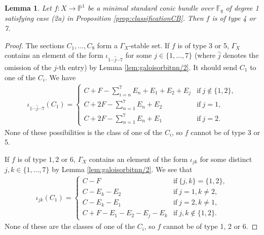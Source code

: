\documentclass[a4paper, 11pt, reqno]{amsart}
\numberwithin{equation}{section} \numberwithin{figure}{section}
\def \F {{\mathbb F}}
\def \P {{\mathbb P}}
\newcommand{\ra}{\rightarrow}
\newtheorem{lemma}{Lemma}
\theoremstyle{definition}
\numberwithin{lemma}{section}
\begin{document}
\begin{lemma}\label{lem:type4type7}
    Let $f \colon X \ra \P^1 $ be a minimal standard conic bundle over $\F_q$ of degree 1 satisfying case (2a) in Proposition \ref{prop:classificationCB}. Then $f$ is of type 4 or 7.
\end{lemma}

\begin{proof}
    The sections $C_1, \ldots, C_8$ form a $\Gamma_X$-stable set. If $f$ is of type 3 or 5, $\Gamma_X$ contains an element of the form $\iota_{1\cdots \hat{j} \cdots 7}$ for some $j \in \{1, \ldots, 7\}$ (where $\hat{j}$ denotes the omission of the $j$-th entry) by Lemma \ref{lem:galoisorbitnn/2}. It should send $C_1$ to one of the $C_i$. We have
\begin{align*}
    \iota_{1\cdots \hat{j} \cdots 7}(C_1) = \begin{cases}
        C + F - \sum_{i=n}^7 E_n + E_1 + E_2 + E_j &\text{if} \ j \notin \{1, 2\},\\
        C + 2F - \sum_{n=1}^7 E_n + E_2 &\text{if} \ j = 1,\\
        C + 2F - \sum_{n=1}^7 E_n + E_1 &\text{if} \ j = 2.
    \end{cases}
\end{align*}
None of these possibilities is the class of one of the $C_i$, so $f$ cannot be of type 3 or 5.

If $f$ is of type $1, 2$ or $6$, $\Gamma_X$ contains an element of the form $\iota_{jk}$ for some distinct $j, k \in \{1, \ldots, 7\}$ by Lemma \ref{lem:galoisorbitnn/2}. We see that
\begin{align*}
    \iota_{jk}(C_1) = \begin{cases}
        C-F &\text{if} \ \{j, k\} = \{1, 2\},\\
        C - E_k - E_2 &\text{if} \ j = 1, k \neq 2,\\
        C - E_k - E_1 &\text{if} \ j = 2, k \neq 1,\\
        C + F - E_1 - E_2 - E_j - E_k &\text{if} \ j, k \notin \{1, 2\}.
    \end{cases}
\end{align*}
None of these are the classes of one of the $C_i$, so $f$ cannot be of type 1, 2 or 6.
\end{proof} 
\end{document}
